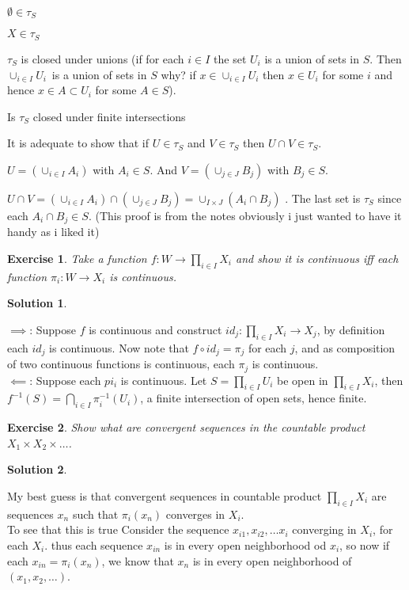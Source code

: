\documentclass[11pt,a4paper]{article}
\newtheorem{Ex}{Exercise}
\newtheorem{Sol}{Solution}
\begin{document}
$\emptyset \in \tau _{S}$

$X\in \tau _{S}$

$\tau _{S}$ is closed under unions (if for each $i\in I$ the set $U_{i}$ is
a union of sets in $S.$ Then $\cup _{i\in I}U_{i}$\ is a union of sets in $S$
why? if $x\in \cup _{i\in I}U_{i}$ then $x\in U_{i}$ for some $i$ and hence $%
x\in A\subset U_{i}$ for some $A\in S$).

Is $\tau _{S}$ closed under finite intersections

It is adequate to show that if $U\in \tau _{S}$ and $V\in \tau _{S}$ then $%
U\cap V\in \tau _{S}.$

$U=(\cup _{i\in I}A_{i})$ with $A_{i}\in S.$ And $V=(\cup _{j\in J}B_{j})$
with $B_{j}\in S.$

$U\cap V=(\cup _{i\in I}A_{i})\cap (\cup _{j\in J}B_{j})=\cup _{I\times
	J}(A_{i}\cap B_{j})$ . The last set is $\tau _{S}$ since each $A_{i}\cap
B_{j}\in S.$ (This proof is from the notes obviously i just wanted to have it handy as i liked it)
\begin{Ex}
	Take a function $f: W \rightarrow \prod_{i \in I}X_i$ and show it is continuous iff each function $\pi_i : W \rightarrow X_i$ is continuous.  
\end{Ex}   

\begin{Sol}\end{Sol}
\noindent $\implies$: Suppose $f$ is continuous and construct $id_j : \prod_{i \in I}X_i \rightarrow X_j$, by definition each $id_j$ is continuous. Now note that $f \circ id_j = \pi_j$ for each $j$, and as composition of two continuous functions is continuous, each $\pi_j$ is continuous.  \\
\noindent$\impliedby$: Suppose each $pi_i$ is continuous. Let $S= \prod_{i \in I}U_i$ be open in $\prod_{i \in I}X_i$, then $f^{-1}(S) = \bigcap_{i \in I}\pi_i^{-1}(U_i)$, a finite intersection of open sets, hence finite.

\begin{Ex}
	Show what are convergent sequences in the countable product $X_1 \times X_2 \times \dots$.
\end{Ex}
\begin{Sol}\end{Sol}
\noindent My best guess is that convergent sequences in countable product $\prod_{i \in I}X_i$ are sequences $x_n$ such that $\pi_i(x_n)$ converges in $X_i$. \\ 
\noindent To see that this is true Consider the sequence $x_{i1}, x_{i2},\dots x_i$ converging in $X_i$, for each $X_i$. thus each sequence $x_{in}$ is in every open neighborhood od $x_i$, so now if each $x_{in} = \pi_i(x_n)$, we know that $x_n$ is in every open neighborhood of $(x_1,x_2,\dots)$.  
\end{document}
